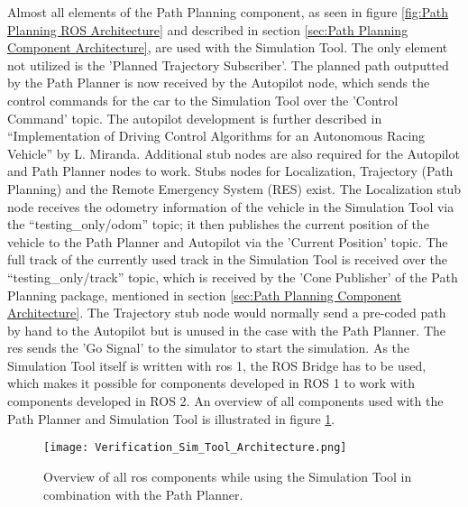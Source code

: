 Almost all elements of the Path Planning component, as seen in figure \ref{fig:Path Planning ROS Architecture} and described in section \ref{sec:Path Planning Component Architecture}, are used with the Simulation Tool. The only element not utilized is the 'Planned Trajectory Subscriber'. The planned path outputted by the Path Planner is now received by the Autopilot node, which sends the control commands for the car to the Simulation Tool over the 'Control Command' topic. The autopilot development is further described in ``Implementation of Driving Control Algorithms for an Autonomous Racing Vehicle'' by L. Miranda. \cite{zur_autopilot} Additional stub nodes are also required for the Autopilot and Path Planner nodes to work. Stubs nodes for Localization, Trajectory (Path Planning) and the Remote Emergency System (RES) exist. The Localization stub node receives the odometry information of the vehicle in the Simulation Tool via the ``testing\_only/odom'' topic; it then publishes the current position of the vehicle to the Path Planner and Autopilot via the 'Current Position' topic. The full track of the currently used track in the Simulation Tool is received over the ``testing\_only/track'' topic, which is received by the 'Cone Publisher' of the Path Planning package, mentioned in section \ref{sec:Path Planning Component Architecture}. The Trajectory stub node would normally send a pre-coded path by hand to the Autopilot but is unused in the case with the Path Planner. The \acrshort{res} sends the 'Go Signal' to the simulator to start the simulation.
As the Simulation Tool itself is written with \acrshort{ros} 1, the ROS Bridge has to be used, which makes it possible for components developed in ROS 1 to work with components developed in ROS 2.
An overview of all components used with the Path Planner and Simulation Tool is illustrated in figure \ref{fig:Verification Sim Tool Architecture}.
\begin{figure}[H]
    \centering
    \texttt{[image: Verification\_Sim\_Tool\_Architecture.png]}
    \caption{Overview of all \acrshort{ros} components while using the Simulation Tool in combination with the Path Planner.}
    \label{fig:Verification Sim Tool Architecture}
\end{figure}